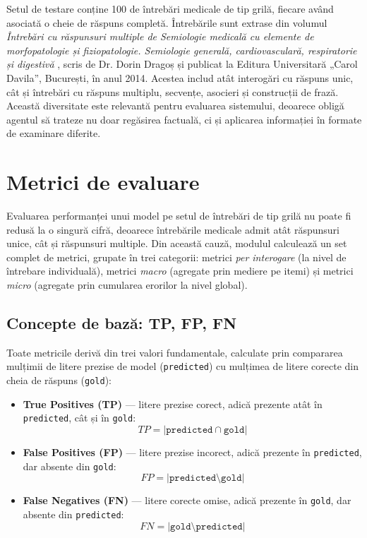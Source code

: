 \documentclass[12pt, a4paper, oneside, romanian]{teza-upb}
\begin{document}
Setul de testare conține 100 de întrebări medicale de tip grilă, fiecare având asociată o cheie de răspuns completă. Întrebările sunt extrase din volumul \textit{Întrebări cu răspunsuri multiple de Semiologie medicală cu elemente de morfopatologie și fiziopatologie. Semiologie generală, cardiovasculară, respiratorie și digestivă} \cite{dragos_semiologie_intrebari_2014}, scris de Dr. Dorin Dragoș și publicat la Editura Universitară „Carol Davila”, București, în anul 2014. Acestea includ atât interogări cu răspuns unic, cât și întrebări cu răspuns multiplu, secvențe, asocieri și construcții de frază. Această diversitate este relevantă pentru evaluarea sistemului, deoarece obligă agentul să trateze nu doar regăsirea factuală, ci și aplicarea informației în formate de examinare diferite.


\section{Metrici de evaluare}

Evaluarea performanței unui model pe setul de întrebări de tip grilă nu poate fi redusă la o singură cifră, deoarece întrebările medicale admit atât răspunsuri unice, cât și răspunsuri multiple. Din această cauză, modulul calculează un set complet de metrici, grupate în trei categorii: metrici \textit{per interogare} (la nivel de întrebare individuală), metrici \textit{macro} (agregate prin mediere pe itemi) și metrici \textit{micro} (agregate prin cumularea erorilor la nivel global).

\subsection{Concepte de bază: TP, FP, FN}

Toate metricile derivă din trei valori fundamentale, calculate prin compararea mulțimii de litere prezise de model (\texttt{predicted}) cu mulțimea de litere corecte din cheia de răspuns (\texttt{gold}):

\begin{itemize}
    \item \textbf{True Positives (TP)} --- litere prezise corect, adică prezente atât în \texttt{predicted}, cât și în \texttt{gold}:
    \[ TP = |\texttt{predicted} \cap \texttt{gold}| \]

    \item \textbf{False Positives (FP)} --- litere prezise incorect, adică prezente în \texttt{predicted}, dar absente din \texttt{gold}:
    \[ FP = |\texttt{predicted} \setminus \texttt{gold}| \]

    \item \textbf{False Negatives (FN)} --- litere corecte omise, adică prezente în \texttt{gold}, dar absente din \texttt{predicted}:
    \[ FN = |\texttt{gold} \setminus \texttt{predicted}| \]
\end{itemize}
\end{document}
